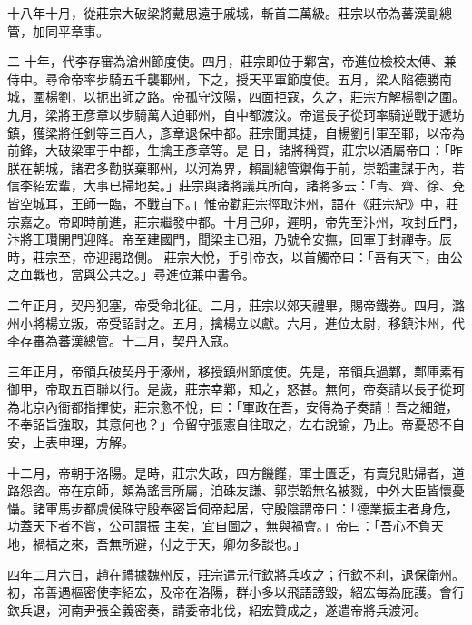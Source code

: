 \begin{pinyinscope}
 十八年十月，從莊宗大破梁將戴思遠于戚城，斬首二萬級。莊宗以帝為蕃漢副總管，加同平章事。



 二
 十年，代李存審為滄州節度使。四月，莊宗即位于鄴宮，帝進位檢校太傅、兼侍中。尋命帝率步騎五千襲鄆州，下之，授天平軍節度使。五月，梁人陷德勝南城，圍楊劉，以扼出師之路。帝孤守汶陽，四面拒寇，久之，莊宗方解楊劉之圍。九月，梁將王彥章以步騎萬人迫鄆州，自中都渡汶。帝遣長子從珂率騎逆戰于遞坊鎮，獲梁將任釗等三百人，彥章退保中都。莊宗聞其捷，自楊劉引軍至鄆，以帝為前鋒，大破梁軍于中都，生擒王彥章等。是
 日，諸將稱賀，莊宗以酒屬帝曰：「昨朕在朝城，諸君多勸朕棄鄆州，以河為界，賴副總管禦侮于前，崇韜畫謀于內，若信李紹宏輩，大事已掃地矣。」莊宗與諸將議兵所向，諸將多云：「青、齊、徐、兗皆空城耳，王師一臨，不戰自下。」惟帝勸莊宗徑取汴州，語在《莊宗紀》中，莊宗嘉之。帝即時前進，莊宗繼發中都。十月己卯，遲明，帝先至汴州，攻封丘門，汴將王瓚開門迎降。帝至建國門，聞梁主已殂，乃號令安撫，回軍于封禪寺。辰時，莊宗至，帝迎謁路側。
 莊宗大悅，手引帝衣，以首觸帝曰：「吾有天下，由公之血戰也，當與公共之。」尋進位兼中書令。



 二年正月，契丹犯塞，帝受命北征。二月，莊宗以郊天禮畢，賜帝鐵券。四月，潞州小將楊立叛，帝受詔討之。五月，擒楊立以獻。六月，進位太尉，移鎮汴州，代李存審為蕃漢總管。十二月，契丹入寇。



 三年正月，帝領兵破契丹于涿州，移授鎮州節度使。先是，帝領兵過鄴，鄴庫素有御甲，帝取五百聯以行。是歲，莊宗幸鄴，知之，怒甚。無何，帝奏請以長子從珂
 為北京內衙都指揮使，莊宗愈不悅，曰：「軍政在吾，安得為子奏請！吾之細鎧，不奉詔旨強取，其意何也？」令留守張憲自往取之，左右說諭，乃止。帝憂恐不自安，上表申理，方解。



 十二月，帝朝于洛陽。是時，莊宗失政，四方饑饉，軍士匱乏，有賣兒貼婦者，道路怨咨。帝在京師，頗為謠言所屬，洎硃友謙、郭崇韜無名被戮，中外大臣皆懷憂懾。諸軍馬步都虞候硃守殷奉密旨伺帝起居，守殷陰謂帝曰：「德業振主者身危，功蓋天下者不賞，公可謂振
 主矣，宜自圖之，無與禍會。」帝曰：「吾心不負天地，禍福之來，吾無所避，付之于天，卿勿多談也。」



 四年二月六日，趙在禮據魏州反，莊宗遣元行欽將兵攻之；行欽不利，退保衛州。初，帝善遇樞密使李紹宏，及帝在洛陽，群小多以飛語謗毀，紹宏每為庇護。會行欽兵退，河南尹張全義密奏，請委帝北伐，紹宏贊成之，遂遣帝將兵渡河。




\end{pinyinscope}
